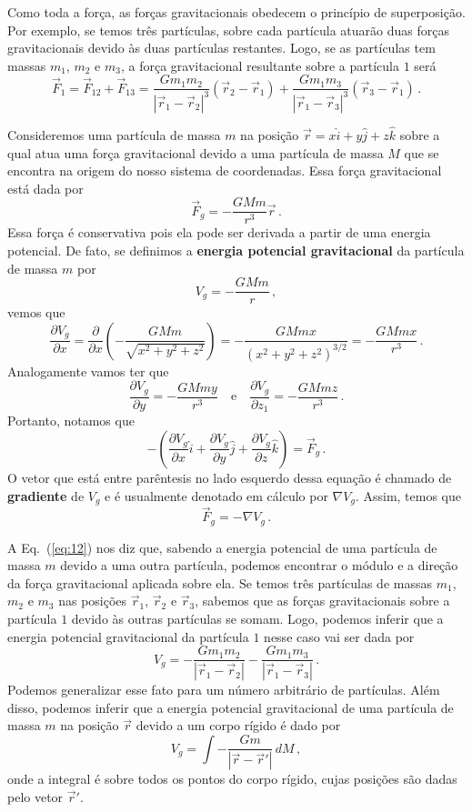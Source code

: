 \documentclass[12pt,a4paper]{article}
\newcommand{\dpar}[1]{\left(#1\right)}
\theoremstyle{definition}
\begin{document}
Como toda a força, as forças gravitacionais obedecem o princípio de
superposição. Por exemplo, se temos três partículas, sobre cada
partícula atuarão duas forças gravitacionais devido às duas partículas
restantes. Logo, se as partículas tem massas $m_1$, $m_2$ e $m_3$, a
força gravitacional resultante sobre a partícula $1$ será
\begin{equation*}
  \vec F_1=\vec F_{12}+\vec F_{13}=\frac{Gm_1m_2}{|\vec r_1-\vec r_2|^3}(\vec r_2-\vec
    r_1)+\frac{Gm_1m_3}{|\vec r_1-\vec r_3|^3}(\vec r_3-\vec r_1)\,.
\end{equation*}

Consideremos uma partícula de massa $m$ na posição
$\vec r=x\hat i+y\hat j+z\hat k$ sobre a qual atua uma força
gravitacional devido a uma partícula de massa $M$ que se encontra na
origem do nosso sistema de coordenadas. Essa força gravitacional está
dada por
$$\vec F_g=-\frac{GMm}{r^3}\vec r\,.$$
Essa força é conservativa pois ela pode ser derivada a partir de uma
energia potencial. De fato, se definimos a \textbf{energia potencial
  gravitacional} da partícula de massa $m$ por
\begin{equation}
  \label{eq:11}
  V_g=-\frac{GMm}{r}\,,
\end{equation}
vemos que
\begin{equation*}
  \frac{\partial V_g}{\partial x}=\frac{\partial}{\partial x}\dpar{-\frac{GMm}{\sqrt{x^2+y^2+z^2}}}=-\frac{GMmx}{(x^2+y^2+z^2)^{3/2}}=-\frac{GMmx}{r^3}\,.
\end{equation*}
Analogamente vamos ter que
$$\frac{\partial V_g}{\partial y}=-\frac{GMmy}{r^3}\quad\text{e}\quad\frac{\partial V_g}{\partial z_1}=-\frac{GMmz}{r^3}\,.$$
Portanto, notamos que
$$-\dpar{\frac{\partial V_g}{\partial x}\hat i+\frac{\partial V_g}{\partial y}\hat j+\frac{\partial V_g}{\partial z}\hat k}=\vec F_g\,.$$
O vetor que está entre parêntesis no lado esquerdo dessa equação é
chamado de \textbf{gradiente} de $V_g$ e é usualmente denotado em
cálculo por $\nabla V_g$. Assim, temos que
\begin{equation}
  \label{eq:12}
  \vec F_g=-\nabla V_g\,.
\end{equation}

A Eq.~(\ref{eq:12}) nos diz que, sabendo a energia potencial de uma
partícula de massa $m$ devido a uma outra partícula, podemos encontrar
o módulo e a direção da força gravitacional aplicada sobre ela. Se
temos três partículas de massas $m_1$, $m_2$ e $m_3$ nas posições
$\vec r_1$, $\vec r_2$ e $\vec r_3$, sabemos que as forças
gravitacionais sobre a partícula $1$ devido às outras partículas se
somam. Logo, podemos inferir que a energia potencial gravitacional da
partícula $1$ nesse caso vai ser dada por
$$V_g=-\frac{Gm_1m_2}{|\vec r_1-\vec r_2|}-\frac{Gm_1m_3}{|\vec r_1-\vec r_3|}\,.$$
Podemos generalizar esse fato para um número arbitrário de
partículas. Além disso, podemos inferir que a energia potencial
gravitacional de uma partícula de massa $m$ na posição $\vec r$ devido
a um corpo rígido é dado por
$$V_g=\int -\frac{Gm}{|\vec r-\vec r'|}\,dM\,,$$
onde a integral é sobre todos os pontos do corpo rígido, cujas
posições são dadas pelo vetor $\vec r'$.
\end{document}

